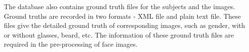 
The database also contains ground truth files for the subjects and the images. Ground truths are recorded in two formats - \mbox{XML} file and plain text file. These files give the detailed ground truth of corresponding images, such as gender, with or without glasses, beard, etc. The information of these ground truth files are required in the pre-processing of face images.


